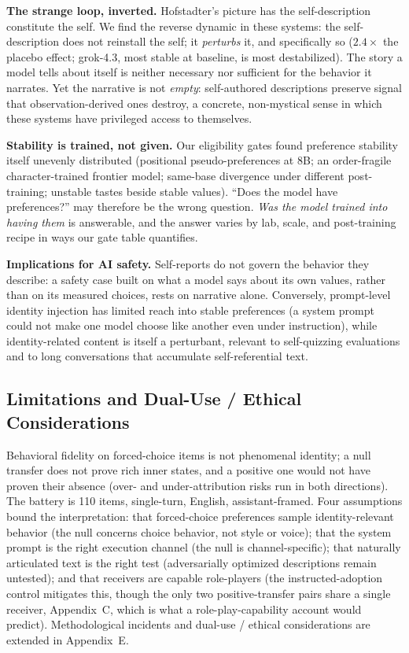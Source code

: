 \documentclass[11pt]{article}
\begin{document}
\textbf{The strange loop, inverted.} Hofstadter's picture has the
self-description constitute the self. We find the reverse dynamic in these
systems: the self-description does not reinstall the self; it
\emph{perturbs} it, and specifically so ($2.4\times$ the placebo effect; grok-4.3,
most stable at baseline, is most destabilized). The story a model tells about
itself is neither necessary nor sufficient for the behavior it narrates. Yet
the narrative is not \emph{empty}: self-authored descriptions preserve signal
that observation-derived ones destroy, a concrete, non-mystical sense in which
these systems have privileged access to themselves.

\textbf{Stability is trained, not given.} Our eligibility gates found
preference stability itself unevenly distributed (positional pseudo-preferences
at 8B; an order-fragile character-trained frontier model; same-base divergence
under different post-training; unstable tastes beside stable values). ``Does
the model have preferences?'' may therefore be the wrong question.
\emph{Was the model trained into having them} is answerable, and the answer
varies by lab, scale, and post-training recipe in ways our gate table
quantifies.

\textbf{Implications for AI safety.} Self-reports do not govern the behavior
they describe: a safety case built on what a model says about its own values,
rather than on its measured choices, rests on narrative alone.
Conversely, prompt-level identity injection has
limited reach into stable preferences (a system prompt could not make one
model choose like another even under instruction), while identity-related
content is itself a perturbant, relevant to self-quizzing evaluations and to
long conversations that accumulate self-referential text.

\subsection*{Limitations and Dual-Use / Ethical Considerations}
Behavioral fidelity on forced-choice items is not phenomenal identity; a null
transfer does not prove rich inner states, and a positive one would not have
proven their absence (over- and under-attribution risks run in both
directions). The battery is 110 items, single-turn, English, assistant-framed.
Four assumptions bound the interpretation: that forced-choice preferences
sample identity-relevant behavior (the null concerns choice behavior, not
style or voice); that the system prompt is the right execution channel (the
null is channel-specific); that naturally articulated text is the right test
(adversarially optimized descriptions remain untested); and that receivers are
capable role-players (the instructed-adoption control mitigates this, though
the only two positive-transfer pairs share a single receiver, Appendix~C,
which is what a role-play-capability account would predict). Methodological
incidents and dual-use / ethical considerations are extended in Appendix~E.
\end{document}
